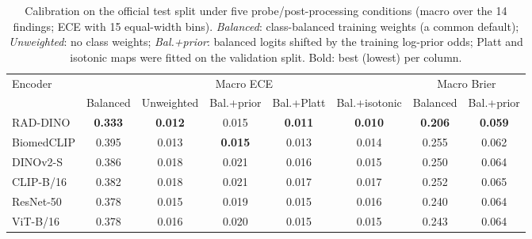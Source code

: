 \begin{table}[H]\centering
\scriptsize
\caption{Calibration on the official test split under five probe/post-processing conditions (macro over the 14 findings; ECE with 15 equal-width bins). \emph{Balanced}: class-balanced training weights (a common default); \emph{Unweighted}: no class weights; \emph{Bal.+prior}: balanced logits shifted by the training log-prior odds; Platt and isotonic maps were fitted on the validation split. Bold: best (lowest) per column.}\label{tab:calibration}
\begin{adjustbox}{max width=\linewidth}
\begin{tabular}{lccccccc}
\toprule
Encoder & \multicolumn{5}{c}{Macro ECE} & \multicolumn{2}{c}{Macro Brier} \\  & Balanced & Unweighted & Bal.+prior & Bal.+Platt & Bal.+isotonic & Balanced & Bal.+prior \\
\midrule
RAD-DINO & \textbf{0.333} & \textbf{0.012} & 0.015 & \textbf{0.011} & \textbf{0.010} & \textbf{0.206} & \textbf{0.059} \\
BiomedCLIP & 0.395 & 0.013 & \textbf{0.015} & 0.013 & 0.014 & 0.255 & 0.062 \\
DINOv2-S & 0.386 & 0.018 & 0.021 & 0.016 & 0.015 & 0.250 & 0.064 \\
CLIP-B/16 & 0.382 & 0.018 & 0.021 & 0.017 & 0.017 & 0.252 & 0.065 \\
ResNet-50 & 0.378 & 0.015 & 0.019 & 0.015 & 0.016 & 0.240 & 0.064 \\
ViT-B/16 & 0.378 & 0.016 & 0.020 & 0.015 & 0.015 & 0.243 & 0.064 \\
\bottomrule
\end{tabular}
\end{adjustbox}
\end{table}
